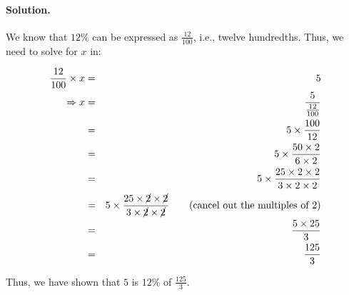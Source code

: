 
\paragraph{Solution.} We know that $12\mbox{\%}$ can be expressed as
$\frac{12}{100}$, i.e., twelve hundredths. Thus, we need to solve for $x$ in:

\begin{eqnarray*}
    \frac{12}{100}\times x &=& 5\\
             \Rightarrow x &=& \frac{5}{\frac{12}{100}}\\
                           &=& 5\times\frac{100}{12}\\
                           &=& 5\times\frac{50\times2}{6\times2}\\
                           &=& 5\times\frac{25\times2\times2}{3\times2\times2}\\
                           &=& 5\times
                               \frac{25\times\cancel{2}\times\cancel{2}}
                                    {3\times\cancel{2}\times\cancel{2}}
                               \qquad\mbox{(cancel out the multiples of 2)}\\
                           &=& \frac{5\times25}{3}\\
                           &=& \frac{125}{3}
\end{eqnarray*}

Thus, we have shown that $5$ is $12\mbox{\%}$ of $\frac{125}{3}$.

